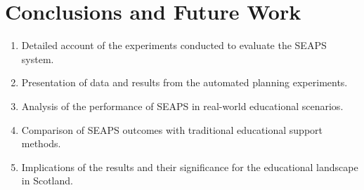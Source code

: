 \section{Conclusions and Future Work}
\begin{enumerate}
    \item Detailed account of the experiments conducted to evaluate the SEAPS system.
    \item Presentation of data and results from the automated planning experiments.
    \item Analysis of the performance of SEAPS in real-world educational scenarios.
    \item Comparison of SEAPS outcomes with traditional educational support methods.
    \item Implications of the results and their significance for the educational landscape in Scotland.
\end{enumerate}
